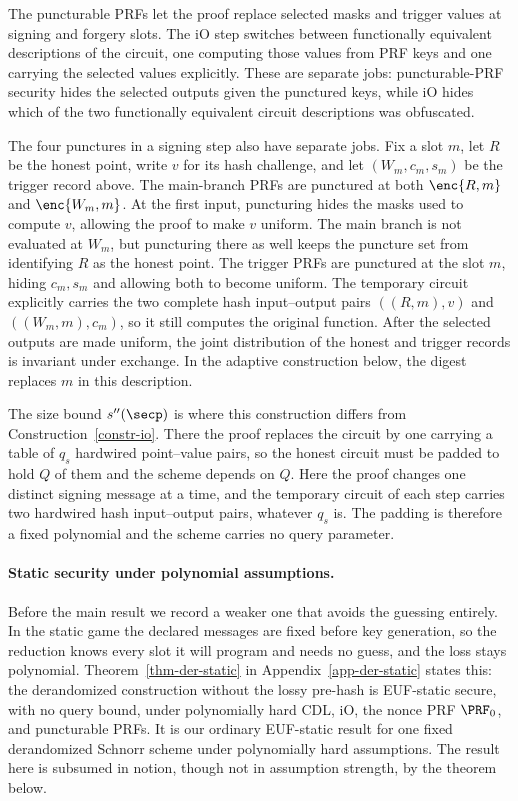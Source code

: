 The puncturable PRFs let the proof replace selected masks and trigger values at signing and forgery slots. The iO step switches between functionally equivalent descriptions of the circuit, one computing those values from PRF keys and one carrying the selected values explicitly. These are separate jobs: puncturable-PRF security hides the selected outputs given the punctured keys, while iO hides which of the two functionally equivalent circuit descriptions was obfuscated.

The four punctures in a signing step also have separate jobs. Fix a slot $m$, let $R$ be the honest point, write $v$ for its hash challenge, and let $(W_m,c_m,s_m)$ be the trigger record above. The main-branch PRFs are punctured at both $\enc{R,m}$ and $\enc{W_m,m}$. At the first input, puncturing hides the masks used to compute $v$, allowing the proof to make $v$ uniform. The main branch is not evaluated at $W_m$, but puncturing there as well keeps the puncture set from identifying $R$ as the honest point. The trigger PRFs are punctured at the slot $m$, hiding $c_m,s_m$ and allowing both to become uniform. The temporary circuit explicitly carries the two complete hash input--output pairs $((R,m),v)$ and $((W_m,m),c_m)$, so it still computes the original function. After the selected outputs are made uniform, the joint distribution of the honest and trigger records is invariant under exchange. In the adaptive construction below, the digest replaces $m$ in this description.

The size bound $s''(\secp)$ is where this construction differs from Construction~\ref{constr-io}. There the proof replaces the circuit by one carrying a table of $q_s$ hardwired point--value pairs, so the honest circuit must be padded to hold $Q$ of them and the scheme depends on $Q$. Here the proof changes one distinct signing message at a time, and the temporary circuit of each step carries two hardwired hash input--output pairs, whatever $q_s$ is. The padding is therefore a fixed polynomial and the scheme carries no query parameter.

\paragraph*{Static security under polynomial assumptions.} Before the main result we record a weaker one that avoids the guessing entirely. In the static game the declared messages are fixed before key generation, so the reduction knows every slot it will program and needs no guess, and the loss stays polynomial. Theorem~\ref{thm-der-static} in Appendix~\ref{app-der-static} states this: the derandomized construction without the lossy pre-hash is EUF-static secure, with no query bound, under polynomially hard CDL, iO, the nonce PRF $\PRF_0$, and puncturable PRFs. It is our ordinary EUF-static result for one fixed derandomized Schnorr scheme under polynomially hard assumptions. The result here is subsumed in notion, though not in assumption strength, by the theorem below.

